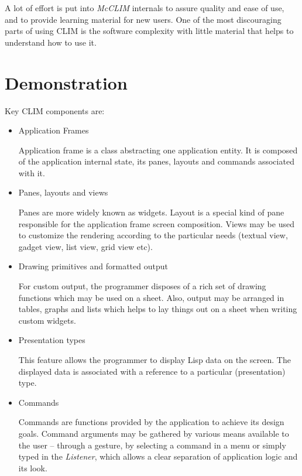 \documentclass{sig-alternate-05-2015}
\begin{document}
A lot of effort is put into \emph{McCLIM} internals to assure quality
and ease of use, and to provide learning material for new users. One
of the most discouraging parts of using CLIM is the software
complexity with little material that helps to understand how to use
it.
\section{Demonstration}

Key CLIM components are:

\begin{itemize}
\item Application Frames

  Application frame is a class abstracting one application entity. It
  is composed of the application internal state, its panes, layouts
  and commands associated with it.

\item Panes, layouts and views

  Panes are more widely known as widgets. Layout is a special kind of
  pane responsible for the application frame screen composition. Views
  may be used to customize the rendering according to the particular
  needs (textual view, gadget view, list view, grid view etc).

\item Drawing primitives and formatted output

  For custom output, the programmer disposes of a rich set of drawing
  functions which may be used on a sheet. Also, output may be arranged
  in tables, graphs and lists which helps to lay things out on a sheet
  when writing custom widgets.

\item Presentation types

  This feature allows the programmer to display Lisp data on the
  screen.  The displayed data is associated with a reference to a
  particular (presentation) type.

\item Commands

  Commands are functions provided by the application to achieve its
  design goals. Command arguments may be gathered by various means
  available to the user – through a gesture, by selecting a command in
  a menu or simply typed in the \emph{Listener}, which allows a clear
  separation of application logic and its look.
\end{itemize}
\end{document}
